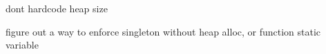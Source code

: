
\begin{DoxyRefList}
\item[\label{todo__todo000002}%
\Hypertarget{todo__todo000002}%
Member \hyperlink{namespace_i_n_i_t_ac811302ce0948a6a097b445b811f9c14}{I\+N\+IT\+:\+:K\+M\+A\+L\+L\+OC} ()]don\textquotesingle{}t hardcode heap size  
\item[\label{todo__todo000001}%
\Hypertarget{todo__todo000001}%
Class \hyperlink{class_k_m_1_1_memory_allocator}{KM\+:\+:Memory\+Allocator} ]figure out a way to enforce singleton without heap alloc, or function static variable 
\end{DoxyRefList}